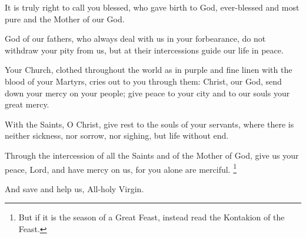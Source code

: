 
\creed


It is truly right to call you blessed, who gave birth to God,
ever-blessed and most pure and the Mother of our God.
\greaterinhonour


\trisagion


God of our fathers, who always deal with us in your forbearance,
do not withdraw your pity from us, but at their intercessions guide our life in peace.

Your Church, clothed throughout the world as in purple and fine linen with the blood of your Martyrs,
cries out to you through them: Christ, our God, send down your mercy on your people;
give peace to your city and to our souls your great mercy.


With the Saints, O Christ, give rest to the souls of your servants,
where there is neither sickness, nor sorrow, nor sighing, but life without end.


Through the intercession of all the Saints and of the Mother of God,
give us your peace, Lord, and have mercy on us, for you alone are merciful.
\footnote{But if it is the season of a Great Feast, instead read the Kontakion of the Feast.}



\hours


\glorybothnow

\greaterinhonour

\throughtheprayers


And save and help us, All-holy Virgin.


